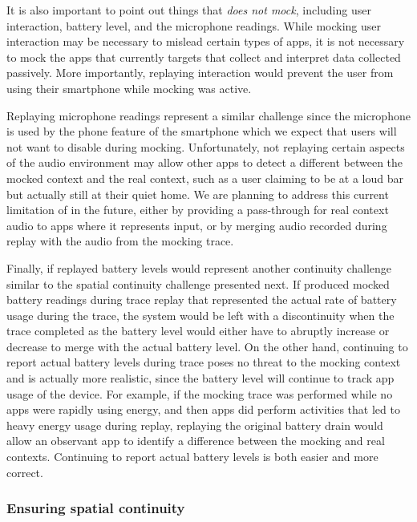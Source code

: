 It is also important to point out things that \PocketMocker{} \textit{does
not mock}, including user interaction, battery level, and the microphone
readings. While mocking user interaction may be necessary to mislead certain
types of apps, it is not necessary to mock the apps that \PocketMocker{}
currently targets that collect and interpret data collected passively. More
importantly, replaying interaction would prevent the user from using their
smartphone while mocking was active.

Replaying microphone readings represent a similar challenge since the
microphone is used by the phone feature of the smartphone which we expect
that users will not want to disable during mocking. Unfortunately, not
replaying certain aspects of the audio environment may allow other apps to
detect a different between the mocked context and the real context, such as a
user claiming to be at a loud bar but actually still at their quiet home. We
are planning to address this current limitation of \PocketMocker{} in the
future, either by providing a pass-through for real context audio to apps
where it represents input, or by merging audio recorded during replay with
the audio from the mocking trace.

Finally, if replayed battery levels would represent another continuity
challenge similar to the spatial continuity challenge presented next. If
\PocketMocker{} produced mocked battery readings during trace replay that
represented the actual rate of battery usage during the trace, the system
would be left with a discontinuity when the trace completed as the battery
level would either have to abruptly increase or decrease to merge with the
actual battery level. On the other hand, continuing to report actual battery
levels during trace poses no threat to the mocking context and is actually
more realistic, since the battery level will continue to track app usage of
the device. For example, if the mocking trace was performed while no apps
were rapidly using energy, and then apps did perform activities that led to
heavy energy usage during replay, replaying the original battery drain would
allow an observant app to identify a difference between the mocking and real
contexts. Continuing to report actual battery levels is both easier and more
correct.

\subsubsection{Ensuring spatial continuity}

